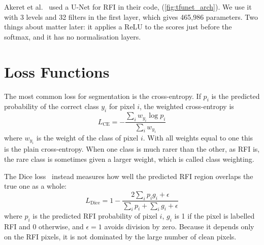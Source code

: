 Akeret et al.~\cite{akeret2017} used a U-Net for RFI in their code,
\tfunet{} (\cref{fig:tfunet_arch}). We use it with 3 levels and 32 filters in
the first layer, which gives 465{,}986 parameters. Two things about \tfunet{}
matter later: it applies a ReLU to the scores just before the softmax, and it has
no normalisation layers.

\section{Loss Functions}
\label{sec:losses}
The most common loss for segmentation is the cross-entropy. If $p_{i}$ is the
predicted probability of the correct class $y_i$ for pixel $i$, the weighted
cross-entropy is
\begin{equation}
  L_{\text{CE}} = -\frac{\sum_i w_{y_i} \log p_{i}}{\sum_i w_{y_i}}
  \label{eq:ce}
\end{equation}
where $w_{y_i}$ is the weight of the class of pixel $i$. With all weights equal
to one this is the plain cross-entropy. When one class is much rarer than the
other, as RFI is, the rare class is sometimes given a larger weight, which is
called class weighting.

The Dice loss~\cite{milletari2016} instead measures how well the predicted
RFI region overlaps the true one as a whole:
\begin{equation}
  L_{\text{Dice}} = 1 - \frac{2\sum_i p_i g_i + \epsilon}{\sum_i p_i + \sum_i g_i + \epsilon}
  \label{eq:dice}
\end{equation}
where $p_i$ is the predicted RFI probability of pixel $i$, $g_i$ is 1 if the
pixel is labelled RFI and 0 otherwise, and $\epsilon = 1$ avoids division by
zero. Because it depends only on the RFI pixels, it is not dominated by the
large number of clean pixels.

